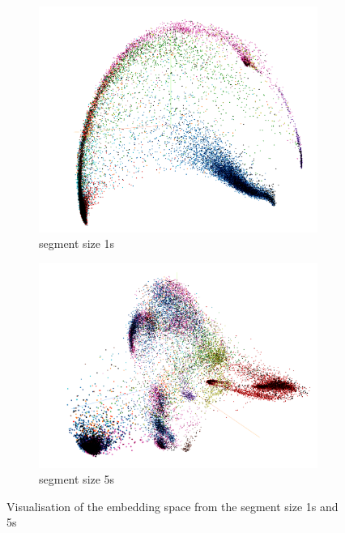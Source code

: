 \begin{figure}[htb]
\centering
\begin{subfigure}{.5\linewidth}
  \centering
  \includegraphics[width=.8\linewidth]{study-doc/experiment_tile_size/assets/embedding_space_1s.png}
  \caption{segment size 1s}
  \label{fig:embedding-1s}
\end{subfigure}%
\begin{subfigure}{.5\linewidth}
  \centering
  \includegraphics[width=.8\linewidth]{study-doc/experiment_tile_size/assets/embedding_space_5s.png}
  \caption{segment size 5s}
  \label{fig:embedding-5s}
\end{subfigure}%
\caption{Visualisation of the embedding space from the segment size 1s and 5s}
\label{fig:tile-size-experiment-embedding-space}
\end{figure}

